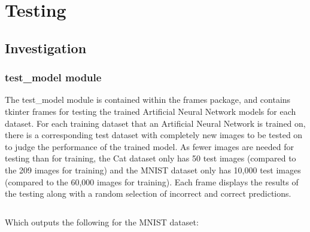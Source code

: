\documentclass[./project-report/src/latex/project-report.tex]{subfiles}
\begin{document}
\maketitle

\section{Testing}

\subsection{Investigation}

\subsubsection{test\_model module}
\label{sec:test_model-module}

The test\_model module is contained within the frames package, and contains tkinter frames for testing the trained Artificial Neural Network models for each dataset. 
For each training dataset that an Artificial Neural Network is trained on, there is a corresponding test dataset with completely new images to be tested on to judge 
the performance of the trained model. As fewer images are needed for testing than for training, the Cat dataset only has 50 test images (compared to the 209 images 
for training) and the MNIST dataset only has 10,000 test images (compared to the 60,000 images for training).
Each frame displays the results of the testing along with a random selection of incorrect and correct predictions.

\inputminted{python}{./school_project/frames/test_model.py}

Which outputs the following for the MNIST dataset:

\pagebreak

\begin{figure}[h!]
\centering
{}
\end{figure}
\end{document}

